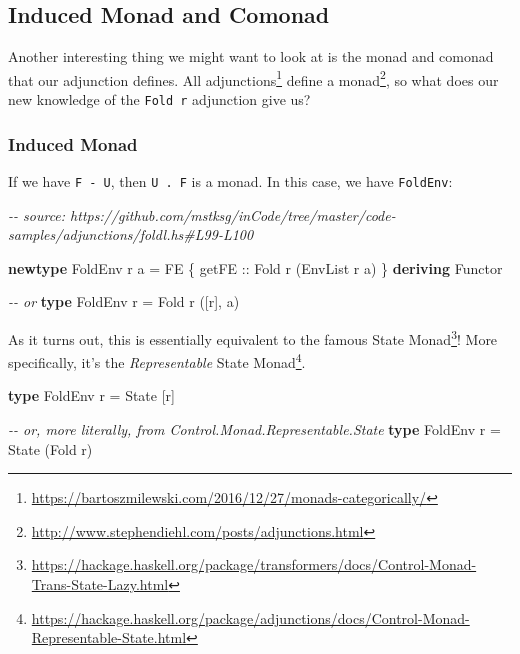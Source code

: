 \documentclass[]{article}
\newenvironment{Shaded}{}{}
\newcommand{\CommentTok}[1]{\textcolor[rgb]{0.38,0.63,0.69}{\textit{#1}}}
\newcommand{\DataTypeTok}[1]{\textcolor[rgb]{0.56,0.13,0.00}{#1}}
\newcommand{\KeywordTok}[1]{\textcolor[rgb]{0.00,0.44,0.13}{\textbf{#1}}}
\newcommand{\NormalTok}[1]{#1}
\newcommand{\OtherTok}[1]{\textcolor[rgb]{0.00,0.44,0.13}{#1}}
\renewcommand{\href}[2]{#2\footnote{\url{#1}}}
\begin{document}
\subsection{Induced Monad and Comonad}\label{induced-monad-and-comonad}

Another interesting thing we might want to look at is the monad and comonad that
our adjunction defines.
\href{https://bartoszmilewski.com/2016/12/27/monads-categorically/}{All
adjunctions} \href{http://www.stephendiehl.com/posts/adjunctions.html}{define a
monad}, so what does our new knowledge of the \texttt{Fold\ r} adjunction give
us?

\subsubsection{Induced Monad}\label{induced-monad}

If we have \texttt{F\ -\textbar{}\ U}, then \texttt{U\ .\ F} is a monad. In this
case, we have \texttt{FoldEnv}:

\begin{Shaded}
\begin{Highlighting}[]
\CommentTok{{-}{-} source: https://github.com/mstksg/inCode/tree/master/code{-}samples/adjunctions/foldl.hs\#L99{-}L100}

\KeywordTok{newtype} \DataTypeTok{FoldEnv}\NormalTok{ r a }\OtherTok{=} \DataTypeTok{FE}\NormalTok{ \{}\OtherTok{ getFE ::} \DataTypeTok{Fold}\NormalTok{ r (}\DataTypeTok{EnvList}\NormalTok{ r a) \}}
  \KeywordTok{deriving} \DataTypeTok{Functor}

\CommentTok{{-}{-} or}
\KeywordTok{type} \DataTypeTok{FoldEnv}\NormalTok{ r }\OtherTok{=} \DataTypeTok{Fold}\NormalTok{ r ([r], a)}
\end{Highlighting}
\end{Shaded}

As it turns out, this is essentially equivalent to the famous
\href{https://hackage.haskell.org/package/transformers/docs/Control-Monad-Trans-State-Lazy.html}{State
Monad}! More specifically, it's the
\href{https://hackage.haskell.org/package/adjunctions/docs/Control-Monad-Representable-State.html}{\emph{Representable}
State Monad}.

\begin{Shaded}
\begin{Highlighting}[]
\KeywordTok{type} \DataTypeTok{FoldEnv}\NormalTok{ r }\OtherTok{=} \DataTypeTok{State}\NormalTok{ [r]}

\CommentTok{{-}{-} or, more literally, from Control.Monad.Representable.State}
\KeywordTok{type} \DataTypeTok{FoldEnv}\NormalTok{ r }\OtherTok{=} \DataTypeTok{State}\NormalTok{ (}\DataTypeTok{Fold}\NormalTok{ r)}
\end{Highlighting}
\end{Shaded}
\end{document}
